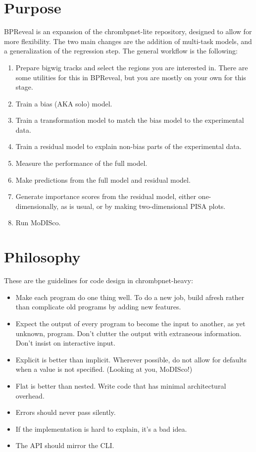 \documentclass{article}
\begin{document}
\section{Purpose}
BPReveal is an expansion of the chrombpnet-lite repository, designed to allow for more flexibility. 
The two main changes are the addition of multi-task models, and a generalization of the regression step. 
The general workflow is the following:

\begin{enumerate}
    \item Prepare bigwig tracks and select the regions you are interested in. There are some utilities for this in BPReveal, but you are mostly on your own for this stage. 
    \item Train a bias (AKA solo) model. 
    \item Train a transformation model to match the bias model to the experimental data. 
    \item Train a residual model to explain non-bias parts of the experimental data. 
    \item Measure the performance of the full model. 
    \item Make predictions from the full model and residual model.
    \item Generate importance scores from the residual model, either one-dimensionally, as is usual, or by making two-dimensional PISA plots. 
    \item Run MoDISco. 
\end{enumerate}

\section{Philosophy}
These are the guidelines for code design in chrombpnet-heavy:

\begin{itemize}
    \item Make each program do one thing well. To do a new job, build afresh rather than complicate old programs by adding new features.
    \item Expect the output of every program to become the input to another, as yet unknown, program. Don't clutter the output with extraneous information. Don't insist on interactive input. 
    \item Explicit is better than implicit. Wherever possible, do not allow for defaults when a value is not specified.  (Looking at you, MoDISco!)
    \item Flat is better than nested. Write code that has minimal architectural overhead. 
    \item Errors should never pass silently.
    \item If the implementation is hard to explain, it's a bad idea.
    \item The API should mirror the CLI. 
\end{itemize}
\end{document}
